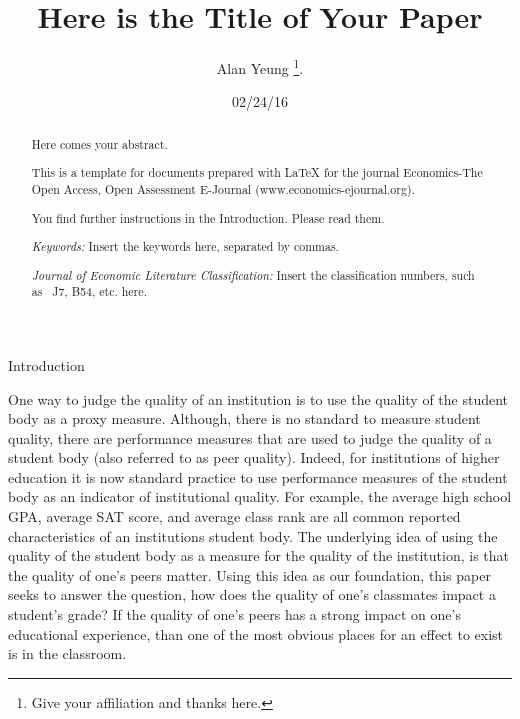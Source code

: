 \documentclass[12pt,a4paper,english,fleqn]{article}
\date{02/24/16}
\makeatletter
\renewcommand\section{\@startsection{section}{1}{\z@}
{-5ex \@plus -1ex \@minus -.2ex}{2.3ex \@plus.2ex}{\normalfont\large\bf}}
\makeatother
\begin{document}
\title{Here is the Title of Your Paper}


\author{Alan Yeung%
\thanks{Give your affiliation and thanks here.%
}.}
\maketitle
\begin{abstract}
\noindent Here comes your abstract.

This is a template for documents prepared with \LaTeX{} for the journal
Economics-The Open Access, Open Assessment E-Journal (www.economics-ejournal.org).

You find further instructions in the Introduction. Please read them.

\noindent \medskip{}


\noindent \emph{Keywords: }Insert the keywords here, separated by
commas.

\noindent \emph{Journal of Economic Literature Classification: }Insert
the classification numbers, such as \ J7, B54,\emph{ }etc. here\emph{.}
\end{abstract}


\newpage{}

\doublespacing

\section{Introduction}\label{intro}

One way to judge the quality of an institution is to use the quality of the student body as a proxy measure. 
Although, there is no standard to measure student quality, there are performance measures that are used to judge the quality of a student body (also referred to as peer quality).
Indeed, for institutions of higher education it is now standard practice to use performance measures of the student body as an indicator of institutional quality.
For example, the average high school GPA, average SAT score, and average class rank are all common reported characteristics of an institutions student body.
The underlying idea of using the quality of the student body as a measure for the quality of the institution, is that the quality of one's peers matter.
Using this idea as our foundation, this paper seeks to answer the question, how does the quality of one's classmates impact a student's grade?
If the quality of one's peers has a strong impact on one's educational experience, than one of the most obvious places for an effect to exist is in the classroom. 
\end{document}

